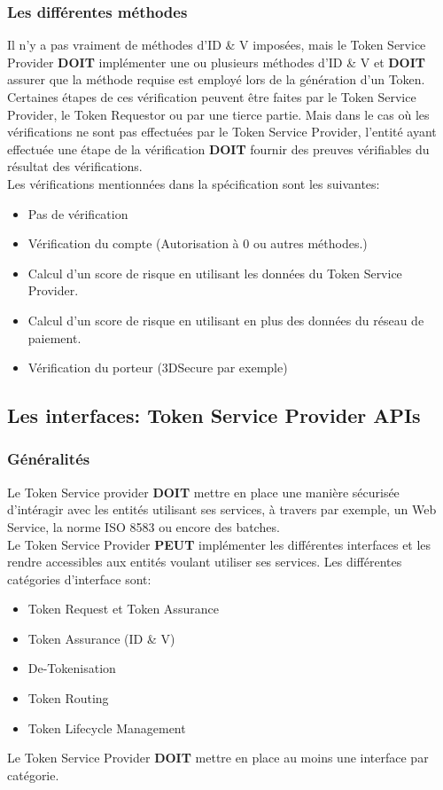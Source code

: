 \documentclass{report}
\begin{document}
\subsubsection{Les différentes méthodes}
Il n'y a pas vraiment de méthodes d'ID \& V imposées, mais le Token Service Provider \textbf{DOIT} implémenter une ou plusieurs méthodes d'ID \& V et \textbf{DOIT} assurer que la méthode requise est employé lors de la génération d'un Token. Certaines étapes de ces vérification peuvent être faites par le Token Service Provider, le Token Requestor ou par une tierce partie. Mais dans le cas où les vérifications ne sont pas effectuées par le Token Service Provider, l'entité ayant effectuée une étape de la vérification \textbf{DOIT} fournir des preuves vérifiables du résultat des vérifications.\\
Les vérifications mentionnées dans la spécification sont les suivantes:
\begin{itemize}
	\item Pas de vérification
	\item Vérification du compte (Autorisation à 0 ou autres méthodes.)
	\item Calcul d'un score de risque en utilisant les données du Token Service Provider.
	\item Calcul d'un score de risque en utilisant en plus des données du réseau de paiement.
	\item Vérification du porteur (3DSecure par exemple)
\end{itemize}


\subsection{Les interfaces: Token Service Provider APIs}
\subsubsection{Généralités}
Le Token Service provider \textbf{DOIT} mettre en place une manière sécurisée d'intéragir avec les entités utilisant ses services, à travers par exemple, un Web Service, la norme ISO 8583 ou encore des batches.\\
Le Token Service Provider \textbf{PEUT} implémenter les différentes interfaces et les rendre accessibles aux entités voulant utiliser ses services. Les différentes catégories d'interface sont:
\begin{itemize}
	\item Token Request et Token Assurance
	\item Token Assurance (ID \& V)
	\item De-Tokenisation
	\item Token Routing
	\item Token Lifecycle Management
\end{itemize}
\noindent
Le Token Service Provider \textbf{DOIT} mettre en place au moins une interface par catégorie.
\end{document}

